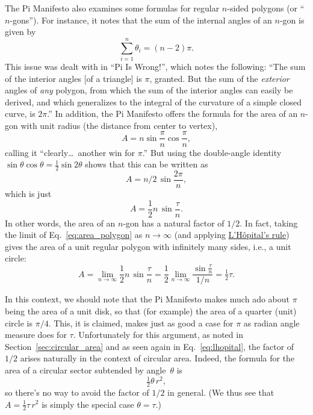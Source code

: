The Pi Manifesto also examines some formulas for regular
$n$-sided polygons (or ``$n$-gons''). For instance, it notes that the sum of the internal angles of an $n$-gon is given by
\[
\sum_{i=1}^n \theta_i=(n-2)\pi.
\]
This issue was dealt with in ``Pi Is Wrong!'', which notes the following: ``The sum of the interior angles [of a
triangle] is $\pi$, granted. But the sum of the \emph{exterior} angles of \emph{any}
polygon, from which the sum of the interior angles can easily be
derived, and which generalizes to the integral of the curvature of a
simple closed curve, is $2\pi$.'' In addition, the Pi Manifesto offers the formula for the area of an $n$-gon with unit radius (the distance from center to vertex),
\[ A=n\sin\frac{\pi}{n}\cos\frac{\pi}{n}, \]
calling it ``clearly\ldots\ another win for $\pi$.'' But using the double-angle identity $\sin\theta\cos\theta = \frac{1}{2} \sin 2\theta$ shows that this can be written as
\[ A = n/2\, \sin\frac{2\pi}{n}, \]
which is just
\begin{equation}
\label{eq:area_polygon}
A = \frac{1}{2} n\, \sin\frac{\tau}{n}.
\end{equation}
In other words, the area of an $n$-gon has a natural
factor of $1/2$. In fact, taking the limit of Eq.~\eqref{eq:area_polygon} as $n\rightarrow \infty$ (and applying \href{http://mathworld.wolfram.com/LHospitalsRule.html}{L'H\^{o}pital's rule}) gives the area of a unit regular polygon with infinitely many sides, i.e., a unit circle:
\begin{equation}
\label{eq:lhopital}
A = \lim_{n\rightarrow\infty} \frac{1}{2} n\, \sin\frac{\tau}{n}
= \frac{1}{2} \lim_{n\rightarrow\infty} \frac{\sin\frac{\tau}{n}}{1/n} = \tfrac{1}{2}\tau.
\end{equation}

In this context, we should note that the Pi Manifesto makes much ado about $\pi$ being the area of a unit disk, so that (for example) the area of a quarter (unit) circle is $\pi/4$. This, it is claimed, makes just as good a case for $\pi$ as radian angle measure does for $\tau$. Unfortunately for this argument, as noted in Section~\ref{sec:circular_area} and as seen again in Eq.~\eqref{eq:lhopital}, the factor of $1/2$ arises naturally in the context of circular area. Indeed, the formula for the area of a circular sector subtended by angle~$\theta$ is
\[
\tfrac{1}{2}\theta\, r^2,
\]
so there's no way to avoid the factor of $1/2$ in general. (We thus see that $A =
\frac{1}{2} \tau\, r^2$ is simply the special case $\theta = \tau$.)

